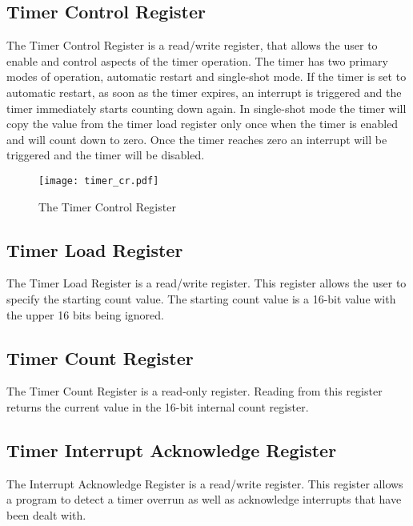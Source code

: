 \subsection{Timer Control Register}

The Timer Control Register is a read/write register, that allows the
user to enable and control aspects of the timer operation. The timer
has two primary modes of operation, automatic restart and single-shot
mode. If the timer is set to automatic restart, as soon as the timer
expires, an interrupt is triggered and the timer immediately starts
counting down again. In single-shot mode the timer will copy the value
from the timer load register only once when the timer is enabled and
will count down to zero. Once the timer reaches zero an interrupt will
be triggered and the timer will be disabled.

\begin{figure}[h]
\begin{center}
\texttt{[image: timer\_cr.pdf]}
\caption{The Timer Control Register}
\label{timer_cr_pic}
\end{center}
\end{figure}

\subsection{Timer Load Register}

The Timer Load Register is a read/write register. This register allows
the user to specify the starting count value. The starting count value
is a 16-bit value with the upper 16 bits being ignored.

\subsection{Timer Count Register}

The Timer Count Register is a read-only register. Reading from this
register returns the current value in the 16-bit internal count
register.

\subsection{Timer Interrupt Acknowledge Register}

The Interrupt Acknowledge Register is a read/write register. This
register allows a program to detect a timer overrun as well as
acknowledge interrupts that have been dealt with.

